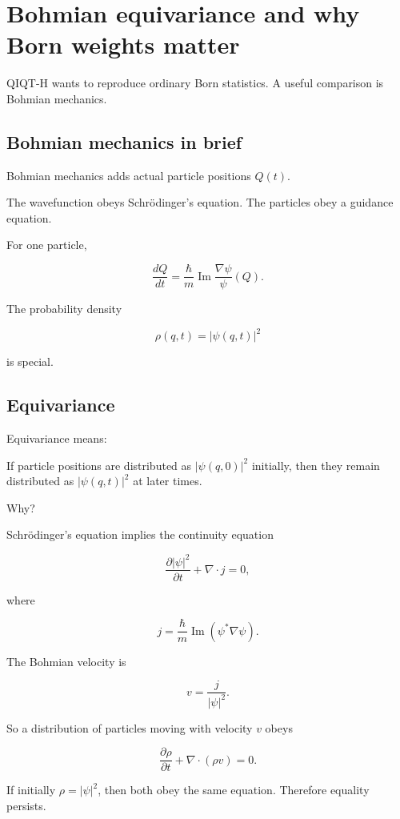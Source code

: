\documentclass[11pt,a4paper]{article}
\newenvironment{qiqtquote}{\begin{mdframed}[style=quotestyle]}{\end{mdframed}}
\begin{document}
\section{Bohmian equivariance and why Born weights matter}

QIQT-H wants to reproduce ordinary Born statistics. A useful comparison is Bohmian mechanics.

\subsection{Bohmian mechanics in brief}

Bohmian mechanics adds actual particle positions $Q(t)$.

The wavefunction obeys Schrödinger’s equation. The particles obey a guidance equation.

For one particle,

\[
\frac{dQ}{dt}
=
\frac{\hbar}{m}\operatorname{Im}
\frac{\nabla\psi}{\psi}(Q).
\]

The probability density

\[
\rho(q,t)=|\psi(q,t)|^2
\]

is special.

\subsection{Equivariance}

Equivariance means:

\begin{qiqtquote}
If particle positions are distributed as $|\psi(q,0)|^2$ initially, then they remain distributed as $|\psi(q,t)|^2$ at later times.
\end{qiqtquote}

Why?

Schrödinger’s equation implies the continuity equation

\[
\frac{\partial |\psi|^2}{\partial t}
+
\nabla\cdot j=0,
\]

where

\[
j=\frac{\hbar}{m}\operatorname{Im}(\psi^*\nabla\psi).
\]

The Bohmian velocity is

\[
v=\frac{j}{|\psi|^2}.
\]

So a distribution of particles moving with velocity $v$ obeys

\[
\frac{\partial \rho}{\partial t}
+
\nabla\cdot(\rho v)=0.
\]

If initially $\rho=|\psi|^2$, then both obey the same equation. Therefore equality persists.
\end{document}
